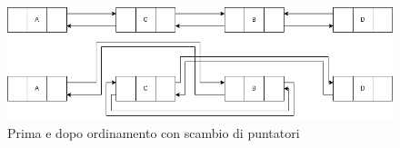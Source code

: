 \begin{figure}[h]
    \centering
    \includegraphics[scale=0.4]{diagrams/swap.png}
    \caption{Prima e dopo ordinamento con scambio di puntatori}
    \label{fig:swap}
\end{figure}

